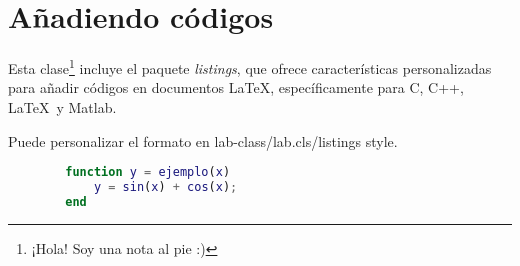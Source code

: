 \documentclass[9pt,a4paper,twocolumn,twoside]{lab-class/lab}
\begin{document}
\section{Añadiendo códigos}

    Esta clase\footnote{¡Hola! Soy una nota al pie :)} incluye el paquete \textit{listings}, que ofrece características personalizadas para añadir códigos en documentos \LaTeX, específicamente para C, C++, \LaTeX\ y Matlab.
    
    Puede personalizar el formato en lab-class/lab.cls/listings style.
    
    \begin{lstlisting}[language=Matlab, caption={Ejemplo de código Matlab.}]
        % Ejemplo de código Matlab
        function y = ejemplo(x)
            y = sin(x) + cos(x);
        end
    \end{lstlisting}




\end{document}

